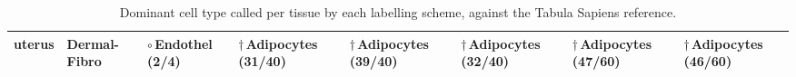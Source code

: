 \begin{table}[t]
{\begin{tabular}{llllllll}
uterus & Dermal-Fibro & \cellcolor{olive!18}$\circ$\,Endothel (2/4) & \cellcolor{magenta!15}$\dagger$\,Adipocytes (31/40) & \cellcolor{magenta!15}$\dagger$\,Adipocytes (39/40) & \cellcolor{magenta!15}$\dagger$\,Adipocytes (32/40) & \cellcolor{magenta!15}$\dagger$\,Adipocytes (47/60) & \cellcolor{magenta!15}$\dagger$\,Adipocytes (46/60) \\
\bottomrule
\end{tabular}
}
\par{}
\caption{Dominant cell type called per tissue by each labelling scheme, against the Tabula Sapiens reference.}
\label{tab:dominance_ranked}
\end{table}
